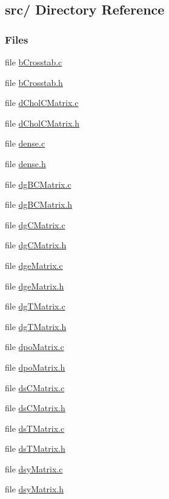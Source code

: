 \hypertarget{dir_000000}{
\subsection{src/ Directory Reference}
\label{dir_000000}
}
\subsubsection*{Files}
\begin{CompactItemize}
\item 
file \hyperlink{bCrosstab_8c}{b\-Crosstab.c}
\item 
file \hyperlink{bCrosstab_8h}{b\-Crosstab.h}
\item 
file \hyperlink{dCholCMatrix_8c}{d\-Chol\-CMatrix.c}
\item 
file \hyperlink{dCholCMatrix_8h}{d\-Chol\-CMatrix.h}
\item 
file \hyperlink{dense_8c}{dense.c}
\item 
file \hyperlink{dense_8h}{dense.h}
\item 
file \hyperlink{dgBCMatrix_8c}{dg\-BCMatrix.c}
\item 
file \hyperlink{dgBCMatrix_8h}{dg\-BCMatrix.h}
\item 
file \hyperlink{dgCMatrix_8c}{dg\-CMatrix.c}
\item 
file \hyperlink{dgCMatrix_8h}{dg\-CMatrix.h}
\item 
file \hyperlink{dgeMatrix_8c}{dge\-Matrix.c}
\item 
file \hyperlink{dgeMatrix_8h}{dge\-Matrix.h}
\item 
file \hyperlink{dgTMatrix_8c}{dg\-TMatrix.c}
\item 
file \hyperlink{dgTMatrix_8h}{dg\-TMatrix.h}
\item 
file \hyperlink{dpoMatrix_8c}{dpo\-Matrix.c}
\item 
file \hyperlink{dpoMatrix_8h}{dpo\-Matrix.h}
\item 
file \hyperlink{dsCMatrix_8c}{ds\-CMatrix.c}
\item 
file \hyperlink{dsCMatrix_8h}{ds\-CMatrix.h}
\item 
file \hyperlink{dsTMatrix_8c}{ds\-TMatrix.c}
\item 
file \hyperlink{dsTMatrix_8h}{ds\-TMatrix.h}
\item 
file \hyperlink{dsyMatrix_8c}{dsy\-Matrix.c}
\item 
file \hyperlink{dsyMatrix_8h}{dsy\-Matrix.h}
\item 

\end{CompactItemize}
